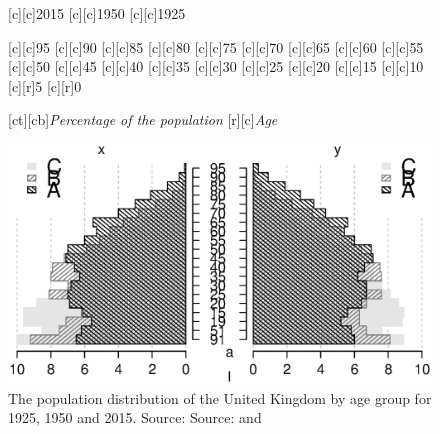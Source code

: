 \documentclass[11 pt, a4paper]{report}
\begin{document}
\begin{figure}[htbp!]
[c][c]{2015}
[c][c]{1950}
[c][c]{1925}

[c][c]{\small{95}}
[c][c]{\small{90}}
[c][c]{\small{85}}
[c][c]{\small{80}}
[c][c]{\small{75}}
[c][c]{\small{70}}
[c][c]{\small{65}}
[c][c]{\small{60}}
[c][c]{\small{55}}
[c][c]{\small{50}}
[c][c]{\small{45}}
[c][c]{\small{40}}
[c][c]{\small{35}}
[c][c]{\small{30}}
[c][c]{\small{25}}
[c][c]{\small{20}}
[c][c]{\small{15}}
[c][c]{\small{10}}
[c][r]{\small{5}}
[c][r]{\small{0}}

[ct][cb]{\small{\emph{Percentage of the population}}}
[r][c]{\small{\emph{Age}}}

\includegraphics[width=\textwidth]{../figures/Fig1.1.eps}
\caption{The population distribution of the United Kingdom by age group for 1925, 1950 and 2015. Source: Source: \citet{ONS2013b} and  \citet{HMD2015}}\label{Fig:01}
\end{figure}
\end{document}
